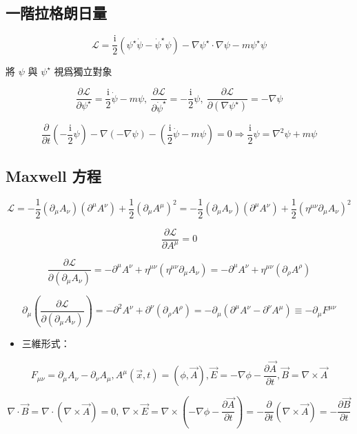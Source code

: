 \documentclass{article}
\begin{document}
\subsection{一階拉格朗日量}

$$\mathcal{L}=\frac{\mathrm{i}}{2}(\psi^{\star}\dot{\psi}-\dot{\psi}^{\star}\psi)-\nabla\psi^{\star}\cdot\nabla\psi-m\psi^{\star}\psi$$

將 $\psi$ 與 $\psi^{\star}$ 視爲獨立對象

$$\frac{\partial\mathcal{L}}{\partial\psi^{\star}}=\frac{\mathrm{i}}{2}\dot{\psi}-m\psi,\ \frac{\partial\mathcal{L}}{\partial\dot{\psi}^{\star}}=-\frac{\mathrm{i}}{2}\psi,\ \frac{\partial\mathcal{L}}{\partial(\nabla\psi^{\star})}=-\nabla\psi$$

$$\frac{\partial}{\partial t}(-\frac{\mathrm{i}}{2}\psi)-\nabla(-\nabla\psi)-(\frac{\mathrm{i}}{2}\dot{\psi}-m\psi)=0\Rightarrow\frac{\mathrm{i}}{2}\psi=\nabla^2\psi+m\psi$$

\subsection{Maxwell 方程}

$$\mathcal{L}=-\frac{1}{2}(\partial_{\mu}A_{\nu})(\partial^{\mu}A^{\nu})+\frac{1}{2}(\partial_{\mu}A^{\mu})^2=-\frac{1}{2}(\partial_{\mu}A_{\nu})(\partial^{\mu}A^{\nu})+\frac{1}{2}(\eta^{\mu\nu}\partial_{\mu}A_{\nu})^2$$

$$\frac{\partial\mathcal{L}}{\partial A^{\mu}}=0$$

$$\frac{\partial\mathcal{L}}{\partial(\partial_{\mu}A_{\nu})}=-\partial^{\mu}A^{\nu}+\eta^{\mu\nu}(\eta^{\mu\nu}\partial_{\mu}A_{\nu})=-\partial^{\mu}A^{\nu}+\eta^{\mu\nu}(\partial_{\rho}A^{\rho})$$

$$\partial_{\mu}(\frac{\partial\mathcal{L}}{\partial(\partial_{\mu}A_{\nu})})=-\partial^2A^{\nu}+\partial^{\nu}(\partial_{\rho}A^{\rho})=-\partial_{\mu}(\partial^{\mu}A^{\nu}-\partial^{\nu}A^{\mu})\equiv-\partial_{\mu}F^{\mu\nu}$$

\begin{itemize}
\item 三維形式：
\end{itemize}

$$F_{\mu\nu}=\partial_{\mu}A_{\nu}-\partial_{\nu}A_{\mu},A^{\mu}(\vec{x},t)=(\phi,\vec{A}),\vec{E}=-\nabla\phi-\frac{\partial\vec{A}}{\partial t},\vec{B}=\nabla\times\vec{A}$$

$$\nabla\cdot\vec{B}=\nabla\cdot(\nabla\times\vec{A})=0,\ \nabla\times\vec{E}=\nabla\times(-\nabla\phi-\frac{\partial\vec{A}}{\partial t})=-\frac{\partial}{\partial t}(\nabla\times\vec{A})=-\frac{\partial\vec{B}}{\partial t}$$
\end{document}
